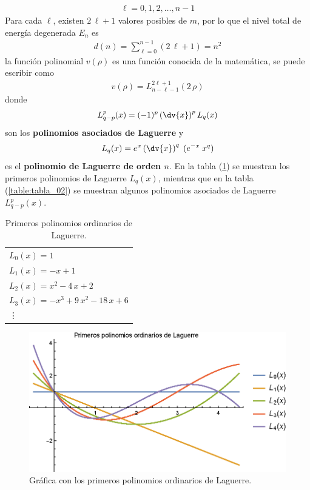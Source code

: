 \begin{align}
\ell = 0, 1, 2, \ldots, n - 1
\label{eq:ecuacion_04_84}
\end{align}
Para cada $\ell$, existen $2 \, \ell + 1$ valores posibles de $m$, por lo que el nivel total de energía degenerada $E_{n}$ es
\begin{align}
d(n) = \sum_{\ell = 0}^{n - 1} (2 \, \ell + 1) = n^{2}
\label{eq:ecuacion_04_85}
\end{align}
la función polinomial $v(\rho)$ es una función conocida de la matemática, se puede escribir como
\begin{align}
v(\rho) = L_{n-\ell-1}^{2\ell+1}(2 \, \rho)
\label{eq:ecuacion_04_86}
\end{align}
donde
\begin{align}
L_{q-p}^{p} (x) = (-1)^{p} \left( \dv{x} \right)^{p} L_{q}(x)
\label{eq:ecuacion_04_87}
\end{align}
son los \textbf{polinomios asociados de Laguerre} y
\begin{align}
L_{q}(x) = e^{x} \left( \dv{x} \right)^{q} \; (e^{-x} \; x^{q})
\label{eq:ecuacion_04_88}
\end{align}
es el \textbf{polinomio de Laguerre de orden $n$}.
En la tabla (\ref{table:tabla_01}) se muestran los primeros polinomios de Laguerre $L_{q}(x)$, mientras que en la tabla (\ref{table:tabla_02}) se muestran algunos polinomios asociados de Laguerre $L_{q-p}^{p}(x)$.
\begin{table}[H]
\centering
\begin{tabular}{l}
$L_{0} (x) = 1$ \\
$L_{1} (x) = - x + 1$ \\
$L_{2} (x) = x^{2} - 4 \, x + 2$ \\
$L_{3} (x) = - x^{3} + 9 \, x^{2} - 18 \, x + 6$ \\
\vdots 
\end{tabular}
\caption{Primeros polinomios ordinarios de Laguerre.}
\label{table:tabla_01}
\end{table}
\begin{figure}[H]
    \centering
    \includegraphics[scale=1]{Imagenes/Polinomios_Laguerre_01.eps}
    \caption{Gráfica con los primeros polinomios ordinarios de Laguerre.}
    \label{fig:grafica_Laguerre_01}
\end{figure}
